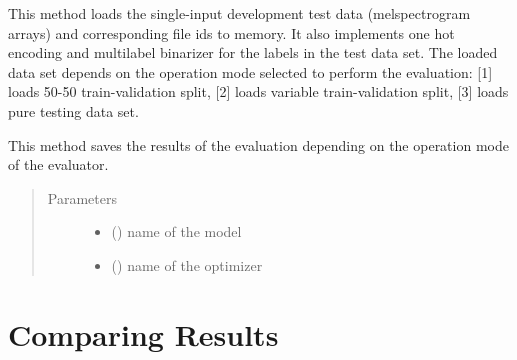 \documentclass[letterpaper,10pt,english]{sphinxmanual}
\begin{document}
\begin{fulllineitems}
\begin{fulllineitems}
\label{\detokenize{evaluate:evaluate.Evaluator.load_test_data}}
This method loads the single-input development test data (melspectrogram arrays) and 
corresponding file ids to memory. It also implements one hot encoding 
and multilabel binarizer for the labels in the test data set. The loaded data set
depends on the operation mode selected to perform the evaluation: {[}1{]} loads 50-50
train-validation split, {[}2{]} loads variable train-validation split, {[}3{]} loads pure 
testing data set.

\end{fulllineitems}


\begin{fulllineitems}
\label{\detokenize{evaluate:evaluate.Evaluator.save_results}}
This method saves the results of the evaluation depending on the operation mode
of the evaluator.
\begin{quote}\begin{description}
\item[{Parameters}] \leavevmode\begin{itemize}
\item {} 
 () \textendash{} name of the model

\item {} 
 () \textendash{} name of the optimizer

\end{itemize}

\end{description}\end{quote}

\end{fulllineitems}


\end{fulllineitems}



\section{Comparing Results}
\label{\detokenize{results:comparing-results}}\label{\detokenize{results::doc}}
\end{document}
